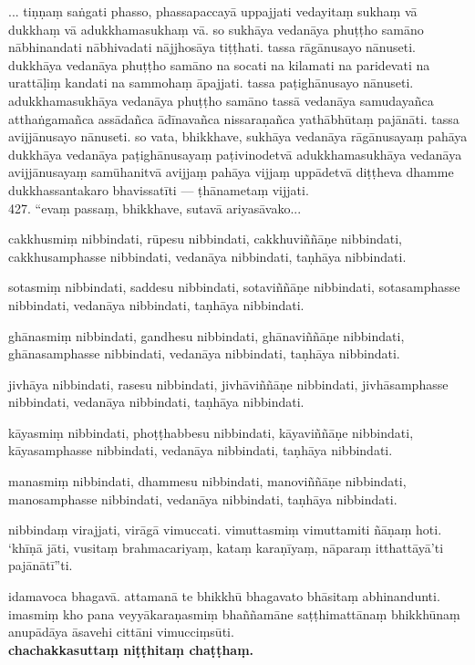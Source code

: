 \documentclass[10pt]{article}
\begin{document}
... tiṇṇaṃ saṅgati phasso, phassapaccayā uppajjati vedayitaṃ sukhaṃ vā dukkhaṃ vā adukkhamasukhaṃ vā. so sukhāya vedanāya phuṭṭho samāno nābhinandati nābhivadati nājjhosāya tiṭṭhati. tassa rāgānusayo nānuseti. dukkhāya vedanāya phuṭṭho samāno na socati na kilamati na paridevati na urattāḷiṃ kandati na sammohaṃ āpajjati. tassa paṭighānusayo nānuseti. adukkhamasukhāya vedanāya phuṭṭho samāno tassā vedanāya samudayañca atthaṅgamañca assādañca ādīnavañca nissaraṇañca yathābhūtaṃ pajānāti. tassa avijjānusayo nānuseti. so vata, bhikkhave, sukhāya vedanāya rāgānusayaṃ pahāya dukkhāya vedanāya paṭighānusayaṃ paṭivinodetvā adukkhamasukhāya vedanāya avijjānusayaṃ samūhanitvā avijjaṃ pahāya vijjaṃ uppādetvā diṭṭheva dhamme dukkhassantakaro bhavissatīti — ṭhānametaṃ vijjati.\\

427. “evaṃ passaṃ, bhikkhave, sutavā ariyasāvako...\

cakkhusmiṃ nibbindati, rūpesu nibbindati, cakkhuviññāṇe nibbindati, cakkhusamphasse nibbindati, vedanāya nibbindati, taṇhāya nibbindati.\

sotasmiṃ nibbindati, saddesu nibbindati, sotaviññāṇe nibbindati, sotasamphasse nibbindati, vedanāya nibbindati, taṇhāya nibbindati.\

ghānasmiṃ nibbindati, gandhesu nibbindati, ghānaviññāṇe nibbindati, ghānasamphasse nibbindati, vedanāya nibbindati, taṇhāya nibbindati.\

jivhāya nibbindati, rasesu nibbindati, jivhāviññāṇe nibbindati, jivhāsamphasse nibbindati, vedanāya nibbindati, taṇhāya nibbindati.\

kāyasmiṃ nibbindati, phoṭṭhabbesu nibbindati, kāyaviññāṇe nibbindati, kāyasamphasse nibbindati, vedanāya nibbindati, taṇhāya nibbindati.\

manasmiṃ nibbindati, dhammesu nibbindati, manoviññāṇe nibbindati, manosamphasse nibbindati, vedanāya nibbindati, taṇhāya nibbindati. \

nibbindaṃ virajjati, virāgā vimuccati. vimuttasmiṃ vimuttamiti ñāṇaṃ hoti. ‘khīṇā jāti, vusitaṃ brahmacariyaṃ, kataṃ karaṇīyaṃ, nāparaṃ itthattāyā’ti pajānātī”ti.\

idamavoca bhagavā. attamanā te bhikkhū bhagavato bhāsitaṃ abhinandunti. imasmiṃ kho pana veyyākaraṇasmiṃ bhaññamāne saṭṭhimattānaṃ bhikkhūnaṃ anupādāya āsavehi cittāni vimucciṃsūti.\\[.5cm]

\centering\textbf{chachakkasuttaṃ niṭṭhitaṃ chaṭṭhaṃ.}
\end{document}

